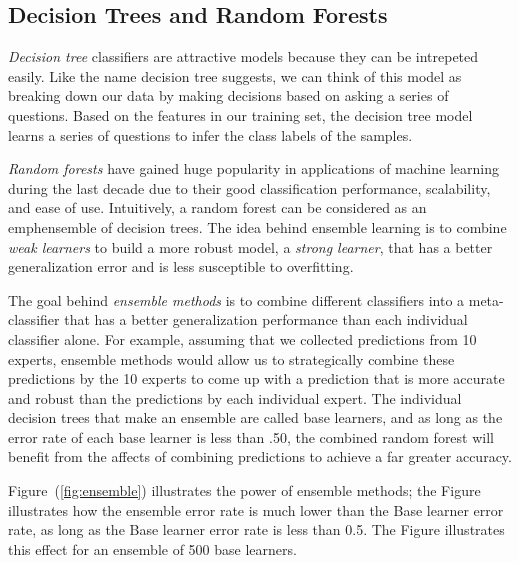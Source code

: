 \documentclass[a4paper,11pt]{article}
\begin{document}
\subsection{Decision Trees and Random Forests}

\emph{Decision tree} classifiers are attractive models because they can be intrepeted easily. Like the name decision tree suggests, we can think of this model as breaking down our data by making decisions based on asking a series of questions.
Based on the features in our training set, the decision tree model learns a series of questions to infer the class labels of the samples. 

\emph{Random forests} have gained huge popularity in applications of machine learning during the last decade due to their good classification performance, scalability, and ease of use. Intuitively, a random forest can be considered as an \\emph{ensemble of decision trees}. The idea behind ensemble learning is to combine \emph{weak learners} to build a more robust model, a \emph{strong learner}, that has a better generalization error and is less susceptible to overfitting. 

The goal behind \emph{ensemble methods} is to combine different classifiers into a meta-classifier that has a better generalization performance than each individual classifier alone. For example, assuming that we collected predictions from 10 experts, ensemble methods would allow us to strategically combine these predictions by the 10 experts to come up with a prediction that is more accurate and robust than the predictions by each individual expert. The individual decision trees that make an ensemble are called base learners, and as long as the error rate of each base learner is less than .50, the combined random forest will benefit from the affects of combining predictions to achieve a far greater accuracy.



Figure~(\ref{fig:ensemble}) illustrates the power of ensemble methods; the Figure illustrates how the ensemble error rate is much lower than the Base learner error rate, as long as the Base learner error rate is less than 0.5. The Figure illustrates this effect for an ensemble of 500 base learners.
\end{document}
